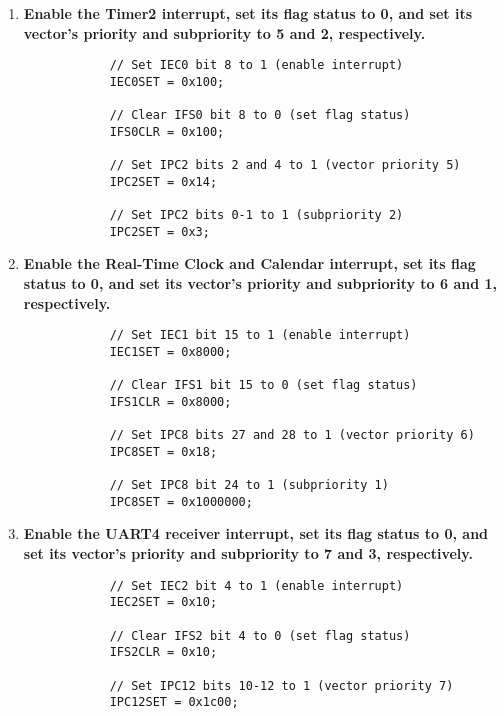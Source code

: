 \documentclass{article}
\begin{document}
\begin{enumerate}[label=\textbf{\arabic*})]
    \begin{enumerate}[label=\textbf{\alph*}.]
        \item \textbf{Enable the Timer2 interrupt, set its flag status to 0, and set its vector’s priority and
        subpriority to 5 and 2, respectively.}

        \begin{lstlisting}
            // Set IEC0 bit 8 to 1 (enable interrupt)
            IEC0SET = 0x100; 

            // Clear IFS0 bit 8 to 0 (set flag status)
            IFS0CLR = 0x100; 

            // Set IPC2 bits 2 and 4 to 1 (vector priority 5)
            IPC2SET = 0x14; 

            // Set IPC2 bits 0-1 to 1 (subpriority 2)
            IPC2SET = 0x3; 
        \end{lstlisting}

        \item \textbf{Enable the Real-Time Clock and Calendar interrupt, set its flag status to 0, and set its
        vector’s priority and subpriority to 6 and 1, respectively.} \\

        \begin{lstlisting}
            // Set IEC1 bit 15 to 1 (enable interrupt)
            IEC1SET = 0x8000; 

            // Clear IFS1 bit 15 to 0 (set flag status)
            IFS1CLR = 0x8000; 

            // Set IPC8 bits 27 and 28 to 1 (vector priority 6)
            IPC8SET = 0x18; 

            // Set IPC8 bit 24 to 1 (subpriority 1)
            IPC8SET = 0x1000000; 
        \end{lstlisting}

        \pagebreak
        \item \textbf{Enable the UART4 receiver interrupt, set its flag status to 0, and set its vector’s
        priority and subpriority to 7 and 3, respectively.} \\

        \begin{lstlisting}
            // Set IEC2 bit 4 to 1 (enable interrupt)
            IEC2SET = 0x10; 

            // Clear IFS2 bit 4 to 0 (set flag status)
            IFS2CLR = 0x10; 

            // Set IPC12 bits 10-12 to 1 (vector priority 7)
            IPC12SET = 0x1c00; 


\end{lstlisting}
\end{enumerate}
\end{enumerate}
\end{document}
